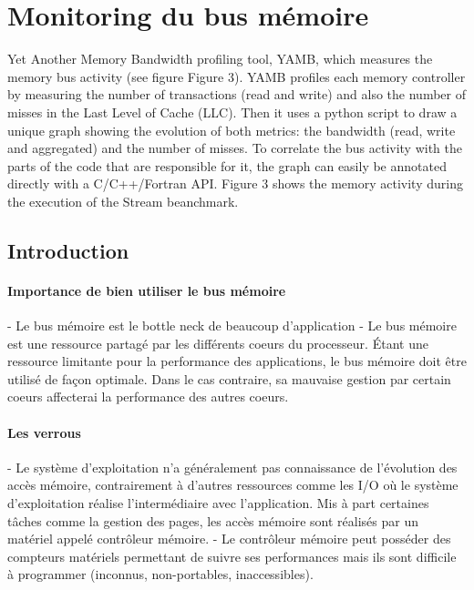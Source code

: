 \section{Monitoring du bus mémoire}\label{sec:yamb}

Yet Another Memory Bandwidth profiling tool, YAMB, which measures the memory bus activity (see figure Figure 3). YAMB profiles each memory controller by measuring the number of transactions (read and write) and also the number of misses in the Last Level of Cache (LLC). Then it uses a python script to draw a unique graph showing the evolution of both metrics: the bandwidth (read, write and aggregated) and the number of misses. To correlate the bus activity with the parts of the code that are responsible for it, the graph can easily be annotated directly with a C/C++/Fortran API. Figure 3 shows the memory activity during the execution of the Stream beanchmark.


\subsection{Introduction}


    \paragraph{Importance de bien utiliser le bus mémoire}
    - Le bus mémoire est le bottle neck de beaucoup d'application
    - Le bus mémoire est une ressource partagé par les différents coeurs du processeur. Étant une ressource limitante pour la performance des applications, le bus mémoire doit être utilisé de façon optimale. Dans le cas contraire, sa mauvaise gestion par certain coeurs affecterai la performance des autres coeurs.


    \paragraph{Les verrous}
    - Le système d'exploitation n'a généralement pas connaissance de l'évolution des accès mémoire, contrairement à d'autres ressources comme les I/O où le système d'exploitation réalise l'intermédiaire avec l'application. Mis à part certaines tâches comme la gestion des pages, les accès mémoire sont réalisés par un matériel appelé contrôleur mémoire. 
    - Le contrôleur mémoire peut posséder des compteurs matériels permettant de suivre ses performances mais ils sont difficile à programmer (inconnus, non-portables, inaccessibles).



